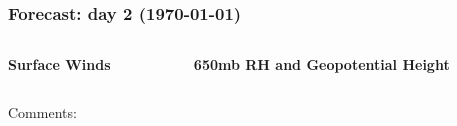 \documentclass[aspectratio=169, 10pt]{beamer}
\begin{document}
\begin{frame}
\frametitle{Forecast: day 2 ({\AdvanceDate[+2]\today})}

\vspace{-.2cm}
\begin{columns}
\begin{column}{0.5\textwidth}
\begin{center}
\textbf{Surface Winds}\\
\end{center}
\end{column}

\begin{column}{0.5\textwidth}
\begin{center}
\textbf{650mb RH and Geopotential Height} \\
\end{center}
\end{column}
\end{columns}

\begin{figure}


\end{figure}


Comments:
\vspace{4cm}


\end{frame}
\end{document}
